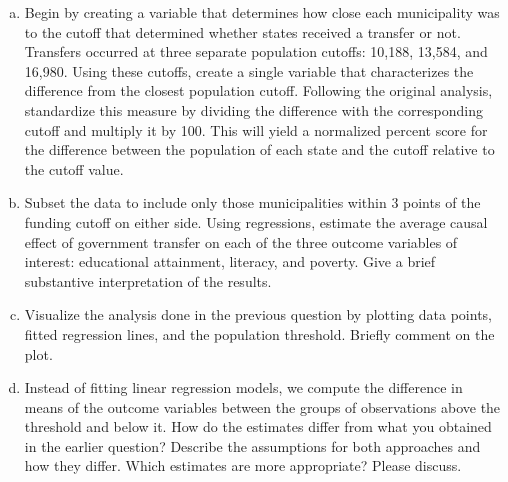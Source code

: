 \documentclass[11pt]{article}
\begin{document}
\begin{enumerate}[a.]
	\item Begin by creating a variable that determines how close each
  municipality was to the cutoff that determined whether states
  received a transfer or not. Transfers occurred at three separate
  population cutoffs: 10,188, 13,584, and 16,980. Using these cutoffs,
  create a single variable that characterizes the difference from the
  closest population cutoff.  Following the original analysis,
  standardize this measure by dividing the difference with the
  corresponding cutoff and multiply it by 100.  This will yield a
  normalized percent score for the difference between the population
  of each state and the cutoff relative to the cutoff value.
  	\item Subset the data to include
  only those municipalities within 3 points of the funding cutoff on
  either side.  Using regressions, estimate the average causal effect
  of government transfer on each of the three outcome variables of
  interest: educational attainment, literacy, and poverty.  Give a
  brief substantive interpretation of the results.
  \item Visualize the analysis done in the previous question by plotting
  data points, fitted regression lines, and the population threshold.
  Briefly comment on the plot.
  \item Instead of fitting linear regression models, we compute the
  difference in means of the outcome variables between the groups of
  observations above the threshold and below it.  How do the estimates
  differ from what you obtained in the earlier question?  Describe the assumptions for both approaches and how they differ.  Which estimates are more appropriate?  Please discuss.
\end{enumerate}
\end{document}
